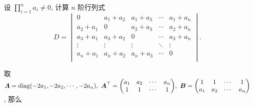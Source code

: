 \begin{example}[2008 上海交通大学]
    \scriptsize\linespread{0.8}
    设 $\displaystyle\prod_{i=1}^{n}a_i\neq0$, 计算 $n$ 阶行列式
    $$D=\begin{vmatrix}
            0       & a_1+a_2 & a_1+a_3 & \cdots & a_1+a_n \\
            a_2+a_1 & 0       & a_2+a_3 & \cdots & a_2+a_n \\
            a_3+a_1 & a_3+a_2 & 0       & \cdots & a_3+a_n \\
            \vdots  & \vdots  & \vdots  & \ddots & \vdots  \\
            a_n+a_1 & a_n+a_2 & a_n+a_3 & \cdots & 0       \\
        \end{vmatrix}.$$
\end{example}
\begin{solution}
    取 $\vb*{\varLambda}=\mathrm{diag} (-2a_1,-2a_2,\cdots,-2a_n),~\vb*{A}^\top=\mqty(a_1&a_2&\cdots& a_n\\1&1&\cdots& 1),~\vb*{B}=\mqty(1&1&\cdots& 1\\a_1&a_2&\cdots& a_n)$, 那么
\end{solution}
